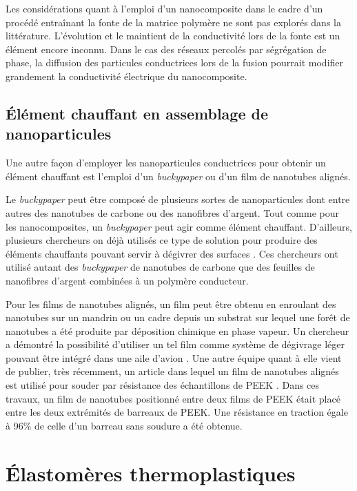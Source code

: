 Les considérations quant à l'emploi d'un nanocomposite dans le cadre d'un procédé entraînant la fonte de la matrice polymère ne sont pas explorés dans la littérature. 
L'évolution et le maintient de la conductivité lors de la fonte est un élément encore inconnu. 
Dans le cas des réseaux percolés par ségrégation de phase, la diffusion des particules conductrices lors de la fusion pourrait modifier grandement la conductivité électrique du nanocomposite. 

\subsection{Élément chauffant en assemblage de nanoparticules}

Une autre façon d'employer les nanoparticules conductrices pour obtenir un élément chauffant est l'emploi d'un \textit{buckypaper} ou d'un film de nanotubes alignés. 

Le \textit{buckypaper} peut être composé de plusieurs sortes de nanoparticules dont entre autres des nanotubes de carbone ou des nanofibres d'argent. 
Tout comme pour les nanocomposites, un \textit{buckypaper} peut agir comme élément chauffant. 
D'ailleurs, plusieurs chercheurs on déjà utilisés ce type de solution pour produire des éléments chauffants pouvant servir à dégivrer des surfaces \cite{Pyo2016,Chu2014,Zhang2013}.
Ces chercheurs ont utilisé autant des \textit{buckypaper} de nanotubes de carbone que des feuilles de nanofibres d'argent combinées à un polymère conducteur. 

Pour les films de nanotubes alignés, un film peut être obtenu en enroulant des nanotubes sur un mandrin ou un cadre depuis un substrat sur lequel une forêt de nanotubes a été produite par déposition chimique en phase vapeur. 
Un chercheur a démontré la possibilité d'utiliser un tel film comme système de dégivrage léger pouvant être intégré dans une aile d'avion \cite{Yao2018}.
Une autre équipe quant à elle vient de publier, très récemment, un article dans lequel un film de nanotubes alignés est utilisé pour souder par résistance des échantillons de PEEK \cite{Russello2019}. 
Dans ces travaux, un film de nanotubes positionné entre deux films de PEEK était placé entre les deux extrémités de barreaux de PEEK. 
Une résistance en traction égale à 96\% de celle d'un barreau sans soudure a été obtenue. 

\FloatBarrier
\section{Élastomères thermoplastiques}  

